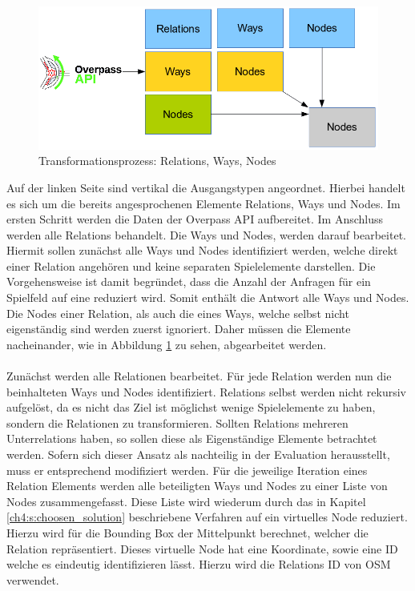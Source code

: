 \begin{figure}[H]
\begin{center}
\includegraphics[width=140mm]{images/ch5_img02_transform.png}
\caption{Transformationsprozess: Relations, Ways, Nodes}
\label{img:ch5_img02_transform}
\end{center}
\end{figure}

Auf der linken Seite sind vertikal die Ausgangstypen angeordnet. Hierbei handelt es sich um die bereits angesprochenen Elemente Relations, Ways und Nodes. Im ersten Schritt werden die Daten der Overpass API aufbereitet. Im Anschluss werden alle Relations behandelt. Die Ways und Nodes, werden darauf bearbeitet. Hiermit sollen zunächst alle Ways und Nodes identifiziert werden, welche direkt einer Relation angehören und keine separaten Spielelemente darstellen. Die Vorgehensweise ist damit begründet, dass die Anzahl der Anfragen für ein Spielfeld auf eine reduziert wird. Somit enthält die Antwort alle Ways und Nodes. Die Nodes einer Relation, als auch die eines Ways, welche selbst nicht eigenständig sind werden zuerst ignoriert. Daher müssen die Elemente nacheinander, wie in Abbildung \ref{img:ch5_img02_transform} zu sehen, abgearbeitet werden.
\\\\
Zunächst werden alle Relationen bearbeitet. Für jede Relation werden nun die beinhalteten Ways und Nodes identifiziert. Relations selbst werden nicht rekursiv aufgelöst, da es nicht das Ziel ist möglichst wenige Spielelemente zu haben, sondern die Relationen zu transformieren. Sollten Relations mehreren Unterrelations haben, so sollen diese als Eigenständige Elemente betrachtet werden. Sofern sich dieser Ansatz  als nachteilig in der Evaluation herausstellt, muss er entsprechend modifiziert werden.
Für die jeweilige Iteration eines Relation Elements werden alle beteiligten Ways und Nodes zu einer Liste von Nodes zusammengefasst. Diese Liste wird wiederum durch das in Kapitel \ref{ch4:s:choosen_solution} beschriebene Verfahren auf ein virtuelles Node reduziert. Hierzu wird für die Bounding Box der Mittelpunkt berechnet, welcher die Relation repräsentiert. Dieses virtuelle Node hat eine Koordinate, sowie eine ID welche es eindeutig identifizieren lässt. Hierzu wird die Relations ID von OSM verwendet.

